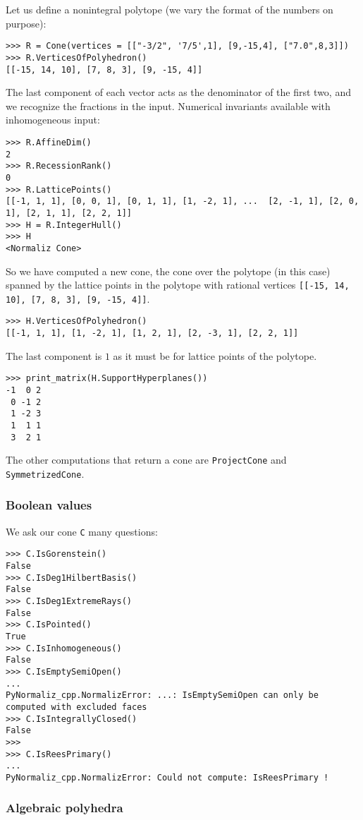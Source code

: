 \documentclass[12pt,a4paper]{scrartcl}
\theoremstyle{definition}
\begin{document}
\begin{small}
Let us define a nonintegral polytope (we vary the format of the numbers on purpose):
\begin{Verbatim}
>>> R = Cone(vertices = [["-3/2", '7/5',1], [9,-15,4], ["7.0",8,3]])
>>> R.VerticesOfPolyhedron()
[[-15, 14, 10], [7, 8, 3], [9, -15, 4]]
\end{Verbatim}
The last component of each vector acts as the denominator of the first two, and we recognize the fractions in the input. Numerical invariants available with inhomogeneous input:
\begin{Verbatim}
>>> R.AffineDim()
2
>>> R.RecessionRank()
0
>>> R.LatticePoints()
[[-1, 1, 1], [0, 0, 1], [0, 1, 1], [1, -2, 1], ...  [2, -1, 1], [2, 0, 1], [2, 1, 1], [2, 2, 1]]
>>> H = R.IntegerHull()
>>> H
<Normaliz Cone>
\end{Verbatim}
So we have computed a new cone, the cone over the polytope (in this case) spanned by the lattice points in the polytope with rational vertices \verb|[[-15, 14, 10], [7, 8, 3], [9, -15, 4]]|.
\begin{Verbatim}
>>> H.VerticesOfPolyhedron()
[[-1, 1, 1], [1, -2, 1], [1, 2, 1], [2, -3, 1], [2, 2, 1]]
\end{Verbatim}
The last component is $1$ as it must be for lattice points of the polytope.
\begin{Verbatim}
>>> print_matrix(H.SupportHyperplanes())
-1  0 2
 0 -1 2
 1 -2 3
 1  1 1
 3  2 1
\end{Verbatim}

The other computations that return a cone are \verb|ProjectCone| and \verb|SymmetrizedCone|.

\subsubsection{Boolean values}

We ask our cone \verb|C| many questions:
\begin{Verbatim}
>>> C.IsGorenstein()
False
>>> C.IsDeg1HilbertBasis()
False
>>> C.IsDeg1ExtremeRays()
False
>>> C.IsPointed()
True
>>> C.IsInhomogeneous()
False
>>> C.IsEmptySemiOpen()
...
PyNormaliz_cpp.NormalizError: ...: IsEmptySemiOpen can only be computed with excluded faces
>>> C.IsIntegrallyClosed()
False
>>> 
>>> C.IsReesPrimary()
...
PyNormaliz_cpp.NormalizError: Could not compute: IsReesPrimary !
\end{Verbatim}


\subsubsection{Algebraic polyhedra}


\end{small}
\end{document}
